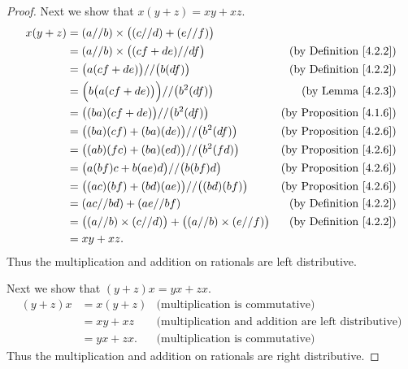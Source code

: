 \begin{proof}
    Next we show that \(x(y + z) = xy + xz\).
    \begin{align*}
        x(y + z) & = (a // b) \times \big((c // d) + (e // f)\big)                                                                 \\
                 & = (a // b) \times \big((cf + de) // df\big)                               & \text{(by Definition \ref{4.2.2})}  \\
                 & = \big(a(cf + de)\big) // \big(b(df)\big)                                 & \text{(by Definition \ref{4.2.2})}  \\
                 & = \Big(b\big(a(cf + de)\big)\Big) // \big(b^2(df)\big)                    & \text{(by Lemma \ref{4.2.3})}       \\
                 & = \big((ba)(cf + de)\big) // \big(b^2(df)\big)                            & \text{(by Proposition \ref{4.1.6})} \\
                 & = \big((ba)(cf) + (ba)(de)\big) // \big(b^2(df)\big)                      & \text{(by Proposition \ref{4.2.6})} \\
                 & = \big((ab)(fc) + (ba)(ed)\big) // \big(b^2(fd)\big)                      & \text{(by Proposition \ref{4.2.6})} \\
                 & = \big(a(bf)c + b(ae)d\big) // \big(b(bf)d\big)                           & \text{(by Proposition \ref{4.2.6})} \\
                 & = \big((ac)(bf) + (bd)(ae)\big) // \big((bd)(bf)\big)                     & \text{(by Proposition \ref{4.2.6})} \\
                 & = (ac // bd) + (ae // bf)                                                 & \text{(by Definition \ref{4.2.2})}  \\
                 & = \big((a // b) \times (c // d)\big) + \big((a // b) \times (e // f)\big) & \text{(by Definition \ref{4.2.2})}  \\
                 & = xy + xz.
    \end{align*}
    Thus the multiplication and addition on rationals are left distributive.

    Next we show that \((y + z)x = yx + zx\).
    \begin{align*}
        (y + z)x & = x(y + z) & \text{(multiplication is commutative)}                     \\
                 & = xy + xz  & \text{(multiplication and addition are left distributive)} \\
                 & = yx + zx. & \text{(multiplication is commutative)}
    \end{align*}
    Thus the multiplication and addition on rationals are right distributive.


\end{proof}
